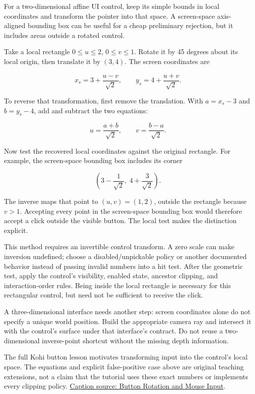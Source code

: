 For a two-dimensional affine UI control, keep its simple bounds in local coordinates and transform the pointer into that space. A screen-space axis-aligned bounding box can be useful for a cheap preliminary rejection, but it includes areas outside a rotated control.

Take a local rectangle \(0\leq u\leq2\), \(0\leq v\leq1\). Rotate it by 45 degrees about its local origin, then translate it by \((3,4)\). The screen coordinates are

\[
x_s=3+\frac{u-v}{\sqrt2},\qquad
y_s=4+\frac{u+v}{\sqrt2}.
\]

To reverse that transformation, first remove the translation. With \(a=x_s-3\) and \(b=y_s-4\), add and subtract the two equations:

\[
u=\frac{a+b}{\sqrt2},\qquad
v=\frac{b-a}{\sqrt2}.
\]

Now test the recovered local coordinates against the original rectangle. For example, the screen-space bounding box includes its corner

\[
\left(3-\frac1{\sqrt2},\;4+\frac3{\sqrt2}\right).
\]

The inverse maps that point to \((u,v)=(1,2)\), outside the rectangle because \(v>1\). Accepting every point in the screen-space bounding box would therefore accept a click outside the visible button. The local test makes the distinction explicit.

This method requires an invertible control transform. A zero scale can make inversion undefined; choose a disabled/unpickable policy or another documented behavior instead of passing invalid numbers into a hit test. After the geometric test, apply the control's visibility, enabled state, ancestor clipping, and interaction-order rules. Being inside the local rectangle is necessary for this rectangular control, but need not be sufficient to receive the click.

A three-dimensional interface needs another step: screen coordinates alone do not specify a unique world position. Build the appropriate camera ray and intersect it with the control's surface under that interface's contract. Do not reuse a two-dimensional inverse-point shortcut without the missing depth information.

The full Kohi button lesson motivates transforming input into the control's local space. The equations and explicit false-positive case above are original teaching extensions, not a claim that the tutorial uses these exact numbers or implements every clipping policy. \href{https://www.youtube.com/watch?v=VuPFUCVGy9U}{Caption source: Button Rotation and Mouse Input}.

